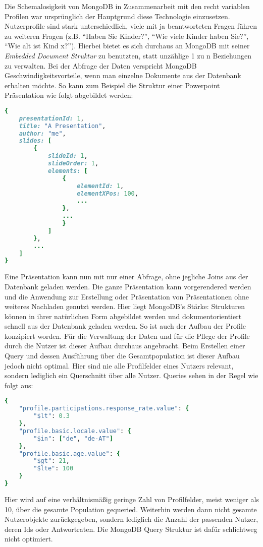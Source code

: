 Die Schemalosigkeit von MongoDB in Zusammenarbeit mit den recht variablen Profilen war ursprünglich der Hauptgrund diese Technologie einzusetzen. Nutzerprofile sind stark unterschiedlich, viele mit ja beantworteten Fragen führen zu weiteren Fragen (z.B. ``Haben Sie Kinder?'', ``Wie viele Kinder haben Sie?'', ``Wie alt ist Kind x?''). Hierbei bietet es sich durchaus an MongoDB mit seiner \textit{Embedded Document Struktur} zu benutzten, statt unzählige 1 zu n Beziehungen zu verwalten.
Bei der Abfrage der Daten verspricht MongoDB Geschwindigkeitsvorteile, wenn man einzelne Dokumente aus der Datenbank erhalten möchte. So kann zum Beispiel die Struktur einer Powerpoint Präsentation wie folgt abgebildet werden:
\begin{lstlisting}[language=Ruby]
{
    presentationId: 1,
    title: "A Presentation",
    author: "me",
    slides: [
        {
            slideId: 1,
            slideOrder: 1,
            elements: [
                {
                    elementId: 1,
                    elementXPos: 100,
                    ...
                },
                ...
                }
            ]
        },
        ...
    ]
}
\end{lstlisting}
Eine Präsentation kann nun mit nur einer Abfrage, ohne jegliche Joins aus der Datenbank geladen werden. Die ganze Präsentation kann vorgerendered werden und die Anwendung zur Erstellung oder Präsentation von Präsentationen ohne weiteres Nachladen genutzt werden. Hier liegt MongoDB's Stärke: Strukturen können in ihrer natürlichen Form abgebildet werden und dokumentorientiert schnell aus der Datenbank geladen werden.
So ist auch der Aufbau der Profile konzipiert worden. Für die Verwaltung der Daten und für die Pflege der Profile durch die Nutzer ist dieser Aufbau durchaus angebracht.
Beim Erstellen einer Query und dessen Ausführung über die Gesamtpopulation ist dieser Aufbau jedoch nicht optimal. Hier sind nie alle Profilfelder eines Nutzers relevant, sondern lediglich ein Querschnitt über alle Nutzer. Queries sehen in der Regel wie folgt aus:
\begin{lstlisting}[language=Ruby]
{
    "profile.participations.response_rate.value": {
        "$lt": 0.3
    },
    "profile.basic.locale.value": {
        "$in": ["de", "de-AT"]
    },
    "profile.basic.age.value": {
        "$gt": 21,
        "$lte": 100
    }
}
\end{lstlisting}

Hier wird auf eine verhältnismäßig geringe Zahl von Profilfelder, meist weniger als 10, über die gesamte Population gequeried. Weiterhin werden dann nicht gesamte Nutzerobjekte zurückgegeben, sondern lediglich die Anzahl der passenden Nutzer, deren Ids oder Antwortraten. Die MongoDB Query Struktur ist dafür schlichtweg nicht optimiert.

